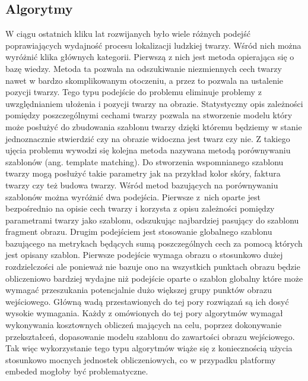 \subsection{Algorytmy}
W ciągu ostatnich kliku lat rozwijanych było wiele różnych podejść poprawiających
wydajność procesu lokalizacji ludzkiej twarzy. Wśród nich można wyróżnić klika
głównych kategorii. Pierwszą z nich jest metoda opierająca się o bazę wiedzy.
Metoda ta pozwala na odszukiwanie niezmiennych cech twarzy nawet w bardzo
skomplikowanym otoczeniu, a przez to pozwala na ustalenie pozycji twarzy. Tego
typu podejście do problemu eliminuje problemy z uwzględnianiem ułożenia i pozycji
twarzy na obrazie. Statystyczny opis zależności pomiędzy poszczególnymi cechami
twarzy pozwala na stworzenie modelu który może posłużyć do zbudowania szablonu
twarzy dzięki któremu będziemy w stanie jednoznacznie stwierdzić czy na obrazie
widoczna jest twarz czy nie. Z takiego ujęcia problemu wywodzi się kolejna metoda
nazywana metodą porównywaniu szablonów (ang. template matching). Do stworzenia
wspomnianego szablonu twarzy mogą posłużyć takie parametry jak na przykład kolor
skóry, faktura twarzy czy też budowa twarzy. Wśród metod bazujących na
porównywaniu szablonów można wyróżnić dwa podejścia. Pierwsze z~nich oparte jest
bezpośrednio na opisie cech twarzy i korzysta z opisu zależności pomiędzy
parametrami twarzy jako szablonu, odszukując najbardziej pasujący do szablonu
fragment obrazu. Drugim podejściem jest stosowanie globalnego szablonu bazującego
na metrykach będących sumą poszczególnych cech za pomocą których jest opisany
szablon. Pierwsze podejście wymaga obrazu o stosunkowo dużej rozdzielczości ale
ponieważ nie bazuje ono na wszystkich punktach obrazu będzie obliczeniowo
bardziej wydajne niż podejście oparte o szablon globalny które może wymagać
przeszukania potencjalnie dużo większej grupy punktów obrazu wejściowego. Główną
wadą przestawionych do tej pory rozwiązań są ich dosyć wysokie wymagania.
Każdy z omówionych do tej pory algorytmów wymagał wykonywania kosztownych
obliczeń mających na celu, poprzez dokonywanie przekształceń, dopasowanie modelu
szablonu do zawartości obrazu wejściowego. Tak więc wykorzystanie tego typu
algorytmów wiąże się z koniecznością użycia stosunkowo mocnych jednostek
obliczeniowych, co w przypadku platformy embeded mogłoby być problematyczne.

